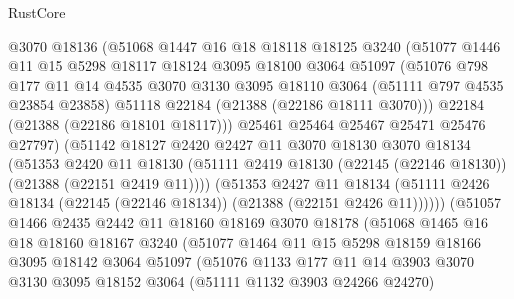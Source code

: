 \begin{lexlean}{RustCore}
\begin{coremodule}
              @3070
              @18136
              (@51068
                @1447
                @16
                @18
                @18118
                @18125
                @3240
                (@51077
                  @1446
                  @11
                  @15
                  @5298
                  @18117
                  @18124
                  @3095
                  @18100
                  @3064
                  @51097
                  (@51076
                    @798
                    @177
                    @11
                    @14
                    @4535
                    @3070
                    @3130
                    @3095
                    @18110
                    @3064
                    (@51111 @797 @4535 @23854 @23858)
                    @51118
                    @22184
                    (@21388 (@22186 @18111 @3070)))
                  @22184
                  (@21388 (@22186 @18101 @18117)))
                @25461
                @25464
                @25467
                @25471
                @25476
                @27797)
              (@51142
                @18127
                @2420
                @2427
                @11
                @3070
                @18130
                @3070
                @18134
                (@51353
                  @2420
                  @11
                  @18130
                  (@51111 @2419 @18130 (@22145 (@22146 @18130)) (@21388 (@22151 @2419 @11))))
                (@51353
                  @2427
                  @11
                  @18134
                  (@51111 @2426 @18134 (@22145 (@22146 @18134)) (@21388 (@22151 @2426 @11))))))
            (@51057
              @1466
              @2435
              @2442
              @11
              @18160
              @18169
              @3070
              @18178
              (@51068
                @1465
                @16
                @18
                @18160
                @18167
                @3240
                (@51077
                  @1464
                  @11
                  @15
                  @5298
                  @18159
                  @18166
                  @3095
                  @18142
                  @3064
                  @51097
                  (@51076
                    @1133
                    @177
                    @11
                    @14
                    @3903
                    @3070
                    @3130
                    @3095
                    @18152
                    @3064
                    (@51111 @1132 @3903 @24266 @24270)

\end{coremodule}
\end{lexlean}
